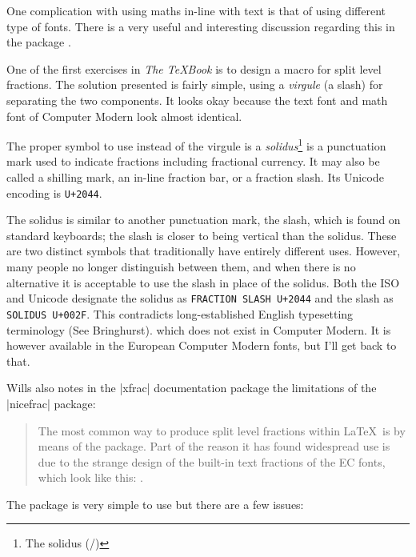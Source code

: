 One complication with using maths in-line with text is that of using different type of fonts. There is a very useful and interesting discussion regarding this in the package  \cite{xfrac}. 

\begin{latexquotation}
 One of the first exercises in \emph{The \TeX Book} is to design a
 macro for split level fractions. The solution presented is fairly
  simple, using a \emph{virgule} (a slash) for separating the two
  components. It looks okay because the text font and math font of
  Computer Modern look almost identical.

  The proper symbol to use instead of the virgule is a \emph{solidus}\footnote{The solidus (/)}  is a punctuation mark used to indicate fractions including fractional currency. It may also be called a shilling mark, an in-line fraction bar, or a fraction slash. Its Unicode encoding is \texttt{U+2044}.
\end{latexquotation}

The solidus is similar to another punctuation mark, the slash, which is found on standard keyboards; the slash is closer to being vertical than the solidus. These are two distinct symbols that traditionally have entirely different uses. However, many people no longer distinguish between them, and when there is no alternative it is acceptable to use the slash in place of the solidus.
Both the ISO and Unicode designate the solidus as \texttt{FRACTION SLASH U+2044} and the slash as \texttt{SOLIDUS U+002F}. This contradicts long-established English typesetting terminology (See Bringhurst).
  which does not exist in Computer Modern. It is however available in
  the European Computer Modern fonts, but I'll get back to that.

Wills also notes in the |xfrac| documentation package the limitations
of the |nicefrac| package:

\begin{quotation}
  The most common way to produce split level fractions within \LaTeX\
  is by means of the  package. Part of the reason it
  has found widespread use is due to the strange design of the
  built-in text fractions of the EC fonts, which look like this:
  \textonehalf. 
\end{quotation}

The package is very simple to use but there are a few
issues:

